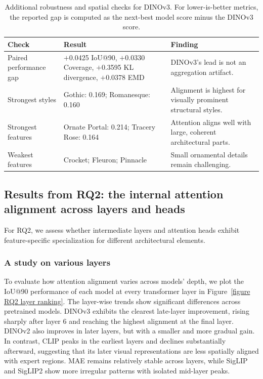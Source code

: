 \documentclass[lineno,pdflatex,sn-mathphys-num]{sn-jnl}%
\theoremstyle{thmstyleone}%
\theoremstyle{thmstyletwo}%
\theoremstyle{thmstylethree}%
\begin{document}
\begin{table}[!h]
\centering
\caption{Additional robustness and spatial checks for DINOv3. For lower-is-better metrics, the reported gap is computed as the next-best model score minus the DINOv3 score.\label{table RQ1 dinov3}}
\begin{tabular}{lp{}p{}}
\toprule
Check & Result & Finding \\ \midrule
Paired performance gap & $+$0.0425 IoU@90, $+$0.0330 Coverage, $+$0.3595 KL divergence, $+$0.0378 EMD & DINOv3's lead is not an aggregation artifact. \\
Strongest styles & Gothic: 0.169; Romanesque: 0.160 & Alignment is highest for visually prominent structural styles. \\
Strongest features & Ornate Portal: 0.214; Tracery Rose: 0.164 & Attention aligns well with large, coherent architectural parts. \\
Weakest features & Crocket; Fleuron; Pinnacle & Small ornamental details remain challenging. \\
\bottomrule
\end{tabular}
\end{table}


\subsection{Results from RQ2: the internal attention alignment across layers and heads}

For RQ2, we assess whether intermediate layers and attention heads exhibit feature-specific specialization for different architectural elements. 

\subsubsection{A study on various layers}

To evaluate how attention alignment varies across models' depth, we plot the IoU@90 performance of each model at every transformer layer in Figure~\ref{figure RQ2 layer ranking}. The layer-wise trends show significant differences across pretrained models. DINOv3 exhibits the clearest late-layer improvement, rising sharply after layer 6 and reaching the highest alignment at the final layer. DINOv2 also improves in later layers, but with a smaller and more gradual gain. In contrast, CLIP peaks in the earliest layers and declines substantially afterward, suggesting that its later visual representations are less spatially aligned with expert regions. MAE remains relatively stable across layers, while SigLIP and SigLIP2 show more irregular patterns with isolated mid-layer peaks. 
\end{document}
